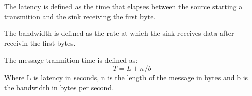 \documentclass{article}
\begin{document}
	The latency is defined as the time that elapses between the source starting a transmition
	and the sink receiving the first byte.
	
	The bandwidth is defined as the rate at which the sink receives data after receivin the first bytes.

	The message tranmition time is defined as:\\
		$$ T = L + n/b$$
	Where L is latency in seconds,
	n is the length of the message in bytes
	and b is the bandwidth in bytes per second.
\end{document}
